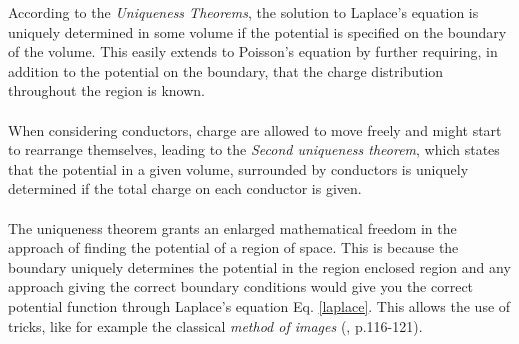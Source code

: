 According to the \textit{Uniqueness Theorems}, the solution to Laplace's equation is uniquely 
determined in some volume if the potential is specified on the boundary of the volume. This
easily extends to Poisson's equation by further requiring, in addition to the 
potential on the boundary, that the charge distribution throughout the region is known.
\\
\\
When considering conductors, charge are allowed to move freely and  might start to rearrange themselves,
leading to the \textit{Second uniqueness theorem}, which states that the potential in a given volume,
surrounded by conductors is uniquely determined if the total charge on each conductor is given.
\\
\\
The uniqueness theorem grants an enlarged mathematical freedom in the approach of finding the potential
of a region of space. This is because the boundary uniquely determines the potential in the region enclosed
region and any approach giving the correct boundary conditions would give you the correct potential 
function through Laplace's equation Eq. \eqref{laplace}. This allows the use of tricks, like for example
the classical \textit{method of images} (\cite{Griffiths}, p.116-121).

